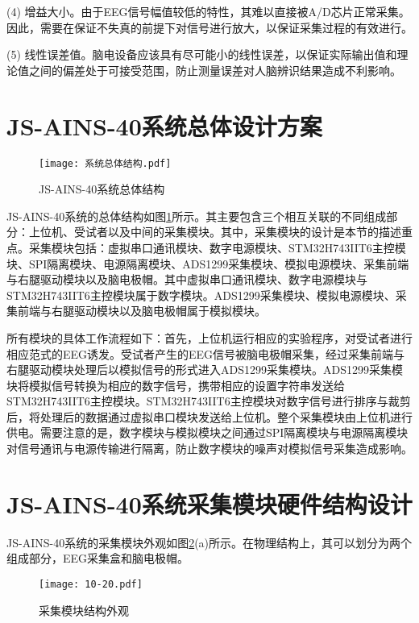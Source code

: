 (4) 增益大小。由于EEG信号幅值较低的特性，其难以直接被A/D芯片正常采集。因此，需要在保证不失真的前提下对信号进行放大，以保证采集过程的有效进行。

(5) 线性误差值。脑电设备应该具有尽可能小的线性误差，以保证实际输出值和理论值之间的偏差处于可接受范围，防止测量误差对人脑辨识结果造成不利影响。


\section{JS-AINS-40系统总体设计方案}


\begin{figure}[!h]
	\centering
	\texttt{[image: 系统总体结构.pdf]}
	\caption{JS-AINS-40系统总体结构}
	\label{fig2-1}
\end{figure}
JS-AINS-40系统的总体结构如图\ref{fig2-1}所示。其主要包含三个相互关联的不同组成部分：上位机、受试者以及中间的采集模块。其中，采集模块的设计是本节的描述重点。采集模块包括：虚拟串口通讯模块、数字电源模块、STM32H743IIT6主控模块、SPI隔离模块、电源隔离模块、ADS1299采集模块、模拟电源模块、采集前端与右腿驱动模块以及脑电极帽。其中虚拟串口通讯模块、数字电源模块与STM32H743IIT6主控模块属于数字模块。ADS1299采集模块、模拟电源模块、采集前端与右腿驱动模块以及脑电极帽属于模拟模块。

所有模块的具体工作流程如下：首先，上位机运行相应的实验程序，对受试者进行相应范式的EEG诱发。受试者产生的EEG信号被脑电极帽采集，经过采集前端与右腿驱动模块处理后以模拟信号的形式进入ADS1299采集模块。ADS1299采集模块将模拟信号转换为相应的数字信号，携带相应的设置字符串发送给STM32H743IIT6主控模块。STM32H743IIT6主控模块对数字信号进行排序与裁剪后，将处理后的数据通过虚拟串口模块发送给上位机。整个采集模块由上位机进行供电。需要注意的是，数字模块与模拟模块之间通过SPI隔离模块与电源隔离模块对信号通讯与电源传输进行隔离，防止数字模块的噪声对模拟信号采集造成影响。

\section{JS-AINS-40系统采集模块硬件结构设计}
JS-AINS-40系统的采集模块外观如图\ref{fig2-22}(a)所示。在物理结构上，其可以划分为两个组成部分，EEG采集盒和脑电极帽。
\vspace{6mm}

\begin{figure}[!h]
	\centering
	\texttt{[image: 10-20.pdf]}
	\caption{采集模块结构外观}
	\label{fig2-22}
\end{figure}

